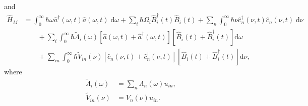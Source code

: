 \documentclass{article}
\begin{document}
and
\begin{equation}
\begin{split}
\hat{H}_M 
&= \int_0^\infty\hbar\omega\hat{a}^\dagger(\omega,t)\hat{a}(\omega,t)\;\mathrm{d}\omega + \sum_i\hbar\Omega_i\hat{B}_i^\dagger(t)\hat{B}_i(t) + \sum_n\int_0^\infty\hbar\nu\hat{c}_n^\dagger(\nu,t)\hat{c}_n(\nu,t)\;\mathrm{d}\nu\\
&\qquad + \sum_i\int_0^\infty\hbar\tilde{\Lambda}_i(\omega)\left[\hat{a}(\omega,t) + \hat{a}^\dagger(\omega,t)\right]\left[\hat{B}_i(t) + \hat{B}_i^\dagger(t)\right]\mathrm{d}\omega\\
&\qquad + \sum_{in}\int_0^\infty\hbar\tilde{V}_{in}(\nu)\left[\hat{c}_n(\nu,t) + \hat{c}_n^\dagger(\nu,t)\right]\left[\hat{B}_i(t) + \hat{B}_i^\dagger(t)\right]\mathrm{d}\nu,
\end{split}
\end{equation}
where
\begin{equation}
\begin{split}
\tilde{\Lambda}_i(\omega) &= \sum_n\Lambda_n(\omega)u_{in},\\
\tilde{V}_{in}(\nu) &= V_n(\nu)u_{in}.
\end{split}
\end{equation}
\end{document}
